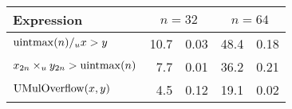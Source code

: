 \begin{tabular}{lr@{$\pm$}lr@{$\pm$}l} \toprule
Expression & \multicolumn{2}{c}{$n = 32$} & \multicolumn{2}{c}{$n = 64$} \\ \midrule
$\operatorname{uintmax}(n) /_u x > y$
& 10.7 & 0.03 & 48.4 & 0.18 \\
$x_{2n} \times_{u} y_{2n} > \operatorname{uintmax}(n)$
&  7.7 & 0.01 & 36.2 & 0.21 \\
$\operatorname{UMulOverflow}(x, y)$
&  4.5 & 0.12 & 19.1 & 0.02 \\
\bottomrule
\end{tabular}

